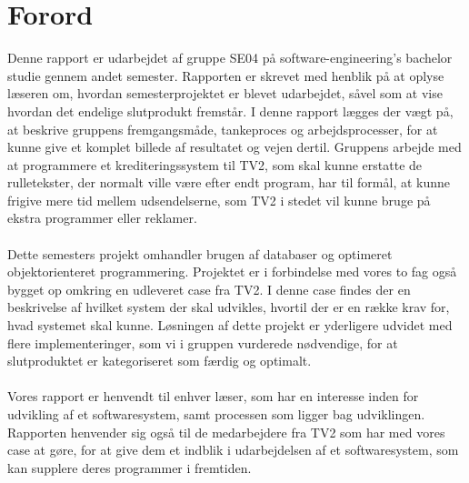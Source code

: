 
\clearpage
\section{Forord}
Denne rapport er udarbejdet af gruppe SE04 på software-engineering's bachelor studie gennem andet semester. Rapporten er skrevet med henblik på at oplyse læseren om, hvordan semesterprojektet er blevet udarbejdet, såvel som at vise hvordan det endelige slutprodukt fremstår. I denne rapport lægges der vægt på, at beskrive gruppens fremgangsmåde, tankeproces og arbejdsprocesser, for at kunne give et komplet billede af resultatet og vejen dertil. Gruppens arbejde med at programmere et krediteringssystem til TV2, som skal kunne erstatte de rulletekster, der normalt ville være efter endt program, har til formål, at kunne frigive mere tid mellem udsendelserne, som TV2 i stedet vil kunne bruge på ekstra programmer eller reklamer.\\\\
Dette semesters projekt omhandler brugen af databaser og optimeret objektorienteret programmering. Projektet er i forbindelse med vores to fag også bygget op omkring en udleveret case fra TV2. I denne case findes der en beskrivelse af hvilket system der skal udvikles, hvortil der er en række krav for, hvad systemet skal kunne. Løsningen af dette projekt er yderligere udvidet med flere implementeringer, som vi i gruppen vurderede nødvendige, for at slutproduktet er kategoriseret som færdig og optimalt.\\\\
Vores rapport er henvendt til enhver læser, som har en interesse inden for udvikling af et softwaresystem, samt processen som ligger bag udviklingen. Rapporten henvender sig også til de medarbejdere fra TV2 som har med vores case at gøre, for at give dem et indblik i udarbejdelsen af et softwaresystem, som kan supplere deres programmer i fremtiden.